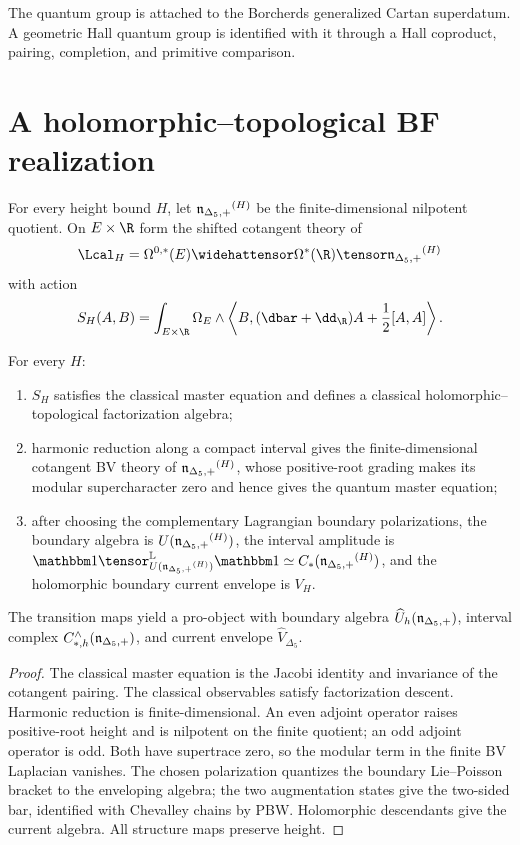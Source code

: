 \begin{remark}
The quantum group is attached to the Borcherds generalized Cartan superdatum.  A geometric Hall quantum group is identified with it through a Hall coproduct, pairing, completion, and primitive comparison.
\end{remark}

\chapter{A holomorphic--topological BF realization}
For every height bound $H$, let ${\mathfrak n_{\Delta_5,+}}^{(H)}$ be the finite-dimensional nilpotent quotient.  On $E\times\R$ form the shifted cotangent theory of
\[
 \Lcal_H=\Omega^{0,*}(E)\widehattensor\Omega^*(\R)\tensor\nIg^{(H)}
\]
with action
\[
 S_H(A,B)=\int_{E\times\R}\Omega_E\wedge
 \left\langle B,(\dbar+\dd_{\R})A+\frac12[A,A]\right\rangle .
\]

\begin{theorem}
For every $H$:
\begin{enumerate}
\item $S_H$ satisfies the classical master equation and defines a classical holomorphic--topological factorization algebra;
\item harmonic reduction along a compact interval gives the finite-dimensional cotangent BV theory of ${\mathfrak n_{\Delta_5,+}}^{(H)}$, whose positive-root grading makes its modular supercharacter zero and hence gives the quantum master equation;
\item after choosing the complementary Lagrangian boundary polarizations, the boundary algebra is $U({\mathfrak n_{\Delta_5,+}}^{(H)})$, the interval amplitude is $\mathbbm1\tensor^{\mathbb L}_{U(\nIg^{(H)})}\mathbbm1\simeq C_*(\nIg^{(H)})$, and the holomorphic boundary current envelope is $V_H$.
\end{enumerate}
The transition maps yield a pro-object with boundary algebra $\widehat U_h({\mathfrak n_{\Delta_5,+}})$, interval complex $C_{*,h}^{\wedge}({\mathfrak n_{\Delta_5,+}})$, and current envelope $\widehat V_{\Delta_5}$.
\end{theorem}
\begin{proof}
The classical master equation is the Jacobi identity and invariance of the cotangent pairing.  The classical observables satisfy factorization descent.  Harmonic reduction is finite-dimensional.  An even adjoint operator raises positive-root height and is nilpotent on the finite quotient; an odd adjoint operator is odd.  Both have supertrace zero, so the modular term in the finite BV Laplacian vanishes.  The chosen polarization quantizes the boundary Lie--Poisson bracket to the enveloping algebra; the two augmentation states give the two-sided bar, identified with Chevalley chains by PBW.  Holomorphic descendants give the current algebra.  All structure maps preserve height.
\end{proof}

